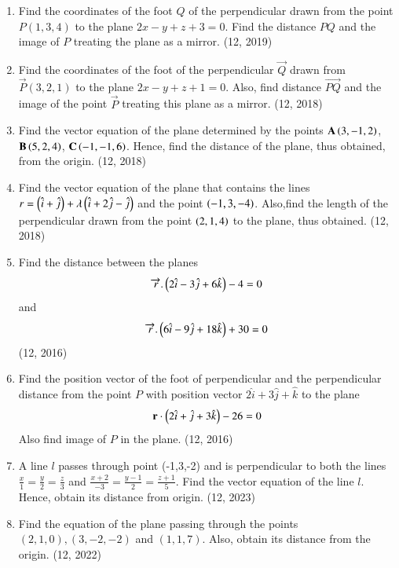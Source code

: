 \begin{enumerate}[label=\thesubsection.\arabic*, ref=\thesubsection.\theenumi]
	\item Find the coordinates of the foot $Q$ of the perpendicular drawn from the point $P(1, 3, 4)$ to the plane $2x - y + z + 3 = 0$. Find the distance $PQ$ and the image of $P$ treating the plane as a mirror. \hfill (12, 2019)
\item Find the coordinates of the foot of the perpendicular $\vec{Q}$ drawn from $\vec{P}(3, 2, 1)$ to the plane $2x - y + z + 1 = 0$. Also, find distance $\vec{PQ}$ and the image of the point $\vec{P}$ treating this plane as a mirror.
\hfill (12, 2018)
\item Find the vector equation of the plane determined by the points $\mathbf{A}\left(3,-1,2\right)$, $\mathbf{B}\left(5,2,4\right)$, $\mathbf{C}\left(-1,-1,6\right)$. Hence, find the distance of the plane, thus obtained, from the origin.
\hfill (12, 2018)
\item Find the vector equation of the plane that contains the lines $r=\left(\hat{i}+\hat{j}\right)+\lambda \left(\hat{i}+2\hat{j} - \hat{j}\right)$ and the point $\left(-1,3,-4\right)$. Also,find the length of the perpendicular drawn from the point $\left(2,1,4\right)$ to the plane, thus obtained.
\hfill (12, 2018) 
\item Find the distance between the planes
      \begin{align*}
          \overrightarrow{r}.\begin{pmatrix}2\hat{i}-3\hat{j}+6\hat{k} \end{pmatrix} - 4 =0
      \end{align*}
      and
      \begin{align*}
          \overrightarrow{r}.\begin{pmatrix}6\hat{i}-9\hat{j} +18\hat{k}\end{pmatrix} +30 =0
      \end{align*}
      \hfill (12, 2016)
\item Find the position vector of the foot of perpendicular and the perpendicular distance from the point $P$ with position vector $2\hat{i}+3\hat{j}+\hat{k}$ to the plane
      \begin{align*}
          \mathbf{r}\cdot\left(2\hat{i}+\hat{j}+3\hat{k}\right) - 26=0
      \end{align*}
      Also find image of $P$ in the plane. \hfill (12, 2016)
\item A line $l$ passes through point (-1,3,-2) and is perpendicular to both the lines $\frac {x}{1}=\frac{y}{2}=\frac{z}{3}$ and $\frac {x+2}{-3}=\frac{y-1}{2}=\frac{z+1}{5}$. Find the vector equation of the line $l$. Hence, obtain its distance from origin. \hfill (12, 2023)
\item Find the equation of the plane passing through the points $(2,1,0),(3,-2,-2)$ and $(1,1,7)$. Also, obtain its distance from the origin. \hfill (12, 2022)


\end{enumerate}
